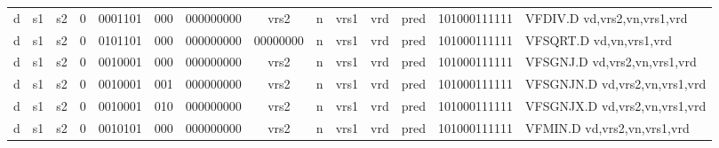 \begin{landscape}
\begin{table}[p]
\begin{small}
\begin{center}
\begin{tabular}{p{0.08in}@{}p{0.08in}@{}p{0.08in}@{}p{0.08in}@{}p{0.50in}@{}p{0.30in}@{}p{0.08in}@{}p{0.8in}@{}p{0.48in}@{}p{0.32in}@{}p{0.08in}@{}p{0.8in}@{}p{0.8in}@{}p{0.4in}@{}p{0.56in}l}
\multicolumn{1}{|c|}{d} &
\multicolumn{1}{c|}{s1} &
\multicolumn{1}{c|}{s2} &
\multicolumn{1}{c|}{0} &
\multicolumn{1}{c|}{0001101} &
\multicolumn{1}{c|}{000} &
\multicolumn{2}{c|}{000000000} &
\multicolumn{2}{c|}{vrs2} &
\multicolumn{1}{c|}{n} &
\multicolumn{1}{c|}{vrs1} &
\multicolumn{1}{c|}{vrd} &
\multicolumn{1}{c|}{pred} &
\multicolumn{1}{c|}{101000111111} & VFDIV.D vd,vrs2,vn,vrs1,vrd \\
\cline{1-15}
  

\multicolumn{1}{|c|}{d} &
\multicolumn{1}{c|}{s1} &
\multicolumn{1}{c|}{s2} &
\multicolumn{1}{c|}{0} &
\multicolumn{1}{c|}{0101101} &
\multicolumn{1}{c|}{000} &
\multicolumn{2}{c|}{000000000} &
\multicolumn{2}{c|}{00000000} &
\multicolumn{1}{c|}{n} &
\multicolumn{1}{c|}{vrs1} &
\multicolumn{1}{c|}{vrd} &
\multicolumn{1}{c|}{pred} &
\multicolumn{1}{c|}{101000111111} & VFSQRT.D vd,vn,vrs1,vrd \\
\cline{1-15}
  

\multicolumn{1}{|c|}{d} &
\multicolumn{1}{c|}{s1} &
\multicolumn{1}{c|}{s2} &
\multicolumn{1}{c|}{0} &
\multicolumn{1}{c|}{0010001} &
\multicolumn{1}{c|}{000} &
\multicolumn{2}{c|}{000000000} &
\multicolumn{2}{c|}{vrs2} &
\multicolumn{1}{c|}{n} &
\multicolumn{1}{c|}{vrs1} &
\multicolumn{1}{c|}{vrd} &
\multicolumn{1}{c|}{pred} &
\multicolumn{1}{c|}{101000111111} & VFSGNJ.D vd,vrs2,vn,vrs1,vrd \\
\cline{1-15}
  

\multicolumn{1}{|c|}{d} &
\multicolumn{1}{c|}{s1} &
\multicolumn{1}{c|}{s2} &
\multicolumn{1}{c|}{0} &
\multicolumn{1}{c|}{0010001} &
\multicolumn{1}{c|}{001} &
\multicolumn{2}{c|}{000000000} &
\multicolumn{2}{c|}{vrs2} &
\multicolumn{1}{c|}{n} &
\multicolumn{1}{c|}{vrs1} &
\multicolumn{1}{c|}{vrd} &
\multicolumn{1}{c|}{pred} &
\multicolumn{1}{c|}{101000111111} & VFSGNJN.D vd,vrs2,vn,vrs1,vrd \\
\cline{1-15}
  

\multicolumn{1}{|c|}{d} &
\multicolumn{1}{c|}{s1} &
\multicolumn{1}{c|}{s2} &
\multicolumn{1}{c|}{0} &
\multicolumn{1}{c|}{0010001} &
\multicolumn{1}{c|}{010} &
\multicolumn{2}{c|}{000000000} &
\multicolumn{2}{c|}{vrs2} &
\multicolumn{1}{c|}{n} &
\multicolumn{1}{c|}{vrs1} &
\multicolumn{1}{c|}{vrd} &
\multicolumn{1}{c|}{pred} &
\multicolumn{1}{c|}{101000111111} & VFSGNJX.D vd,vrs2,vn,vrs1,vrd \\
\cline{1-15}
  

\multicolumn{1}{|c|}{d} &
\multicolumn{1}{c|}{s1} &
\multicolumn{1}{c|}{s2} &
\multicolumn{1}{c|}{0} &
\multicolumn{1}{c|}{0010101} &
\multicolumn{1}{c|}{000} &
\multicolumn{2}{c|}{000000000} &
\multicolumn{2}{c|}{vrs2} &
\multicolumn{1}{c|}{n} &
\multicolumn{1}{c|}{vrs1} &
\multicolumn{1}{c|}{vrd} &
\multicolumn{1}{c|}{pred} &
\multicolumn{1}{c|}{101000111111} & VFMIN.D vd,vrs2,vn,vrs1,vrd \\
\cline{1-15}
  


\end{tabular}
\end{center}
\end{small}
\end{table}
\end{landscape}
